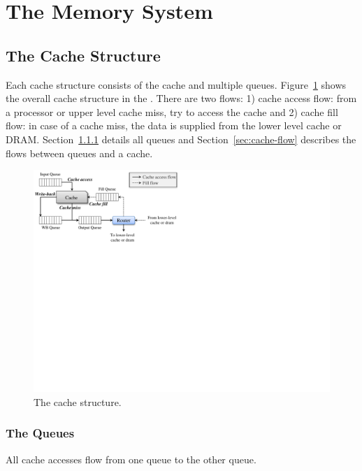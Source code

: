 
\clearpage
\section{The Memory System}
\label{sec:memory}

\subsection{The Cache Structure}

Each cache structure consists of the cache and multiple
queues. Figure~\ref{fig:cache} shows the overall cache structure in
the \SIM. There are two flows: 1) cache access flow: from a processor
or upper level cache miss, try to access the cache and 2) cache fill
flow: in case of a cache miss, the data is supplied from the lower
level cache or DRAM. Section~\ref{sec:queue} details all queues and
Section~\ref{sec:cache-flow} describes the flows between queues and a
cache.

\begin{figure}[htb]
\centering
\includegraphics{figs/cache}
\caption{The cache structure.}
\label{fig:cache}
\end{figure}


\subsubsection{The Queues}
\label{sec:queue}

All cache accesses flow from one queue to the other queue. 

